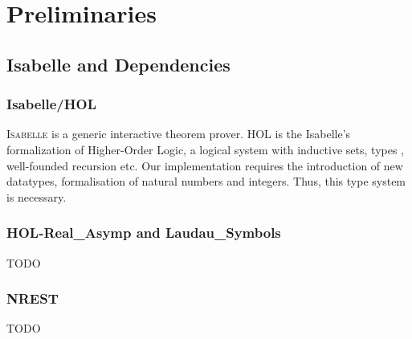 \newcommand{\red}{\leq_p}
\newcommand{\problem}[3]{
\begin{quote}
    {#1} \\
    \textbf{Input}: {#2}\\
    \textbf{Output}: {#3}
\end{quote}
}

\chapter{Preliminaries}\label{chapter:preliminaries}
\section{Isabelle and Dependencies}
\subsection*{Isabelle/HOL}
\textsc{Isabelle} is a generic interactive theorem prover. \textsc{HOL} is the Isabelle's formalization of Higher-Order Logic, a logical system with inductive sets, types , well-founded recursion etc. Our implementation requires the introduction of new datatypes, formalisation of natural numbers and integers. Thus, this type system is necessary.


\subsection*{HOL-Real\_Asymp and Laudau\_Symbols}
TODO

\subsection*{NREST}
TODO

